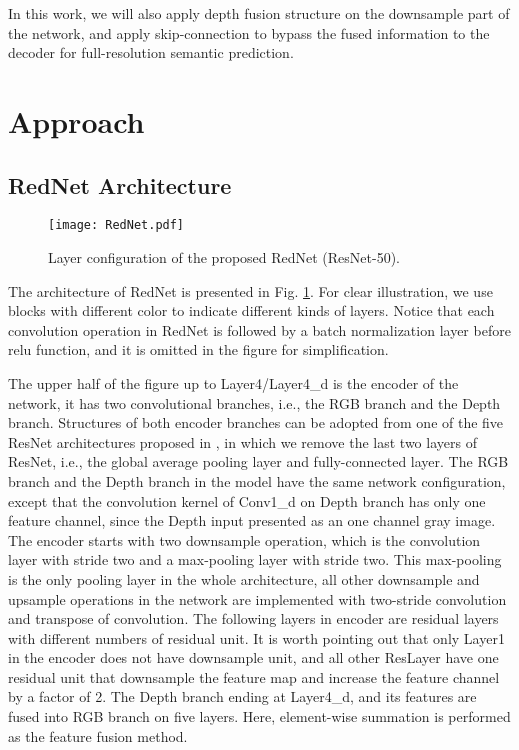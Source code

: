 \documentclass[runningheads]{llncs}
\begin{document}
In this work, we will also apply depth fusion structure on the downsample part of the network, and apply skip-connection to bypass the fused information to the decoder for full-resolution semantic prediction.

\section{Approach} \label{sec:approach}

\subsection{RedNet Architecture}

\begin{figure}[!t]
    \centering
    \texttt{[image: RedNet.pdf]}
    \caption{Layer configuration of the proposed RedNet (ResNet-50).}
    \label{fig:rednet}
\end{figure}

The architecture of RedNet is presented in Fig. \ref{fig:rednet}. For clear illustration, we use blocks with different color to indicate different kinds of layers. Notice that each convolution operation in RedNet is followed by a batch normalization layer \cite{ioffe2015batch} before relu function, and it is omitted in the figure for simplification.

The upper half of the figure up to Layer4/Layer4\_d is the encoder of the network, it has two convolutional branches, i.e., the RGB branch and the Depth branch. Structures of both encoder branches can be adopted from one of the five ResNet architectures proposed in \cite{he2016deep}, in which we remove the last two layers of ResNet, i.e., the global average pooling layer and fully-connected layer. The RGB branch and the Depth branch in the model have the same network configuration, except that the convolution kernel of Conv1\_d on Depth branch has only one feature channel, since the Depth input presented as an one channel gray image. The encoder starts with two downsample operation, which is the  convolution layer with stride two and a  max-pooling layer with stride two. This max-pooling is the only pooling layer in the whole architecture, all other downsample and upsample operations in the network are implemented with two-stride convolution and transpose of convolution. The following layers in encoder are residual layers with different numbers of residual unit. It is worth pointing out that only Layer1 in the encoder does not have downsample unit, and all other ResLayer have one residual unit that downsample the feature map and increase the feature channel by a factor of 2. The Depth branch ending at Layer4\_d, and its features are fused into RGB branch on five layers. Here, element-wise summation is performed as the feature fusion method.
\end{document}
